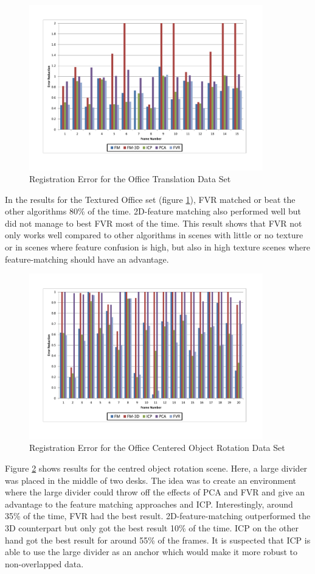 \begin{figure}[!htb]
\centering
\includegraphics[width=4.0in]{images/results/Office_TexturedItems_Translation}
\caption{Registration Error for the Office Translation Data Set}
\label{fig:PET8}
\end{figure}

In the results for the Textured Office set (figure \ref{fig:PET8}), FVR matched or beat the other algorithms 80\% of the time. 2D-feature matching also performed well but did not manage to best FVR most of the time. This result shows that FVR not only works well compared to other algorithms in scenes with little or no texture or in scenes where feature confusion is high, but also in high texture scenes where feature-matching should have an advantage. \\


\begin{figure}[!htb]
\centering
\includegraphics[width=4.0in]{images/results/Office_Texture_blind_spot_rotation}
\caption{Registration Error for the Office Centered Object Rotation Data Set}
\label{fig:PET9}
\end{figure}

Figure \ref{fig:PET9} shows results for the centred object rotation scene. Here, a large divider was placed in the middle of two desks. The idea was to create an environment where the large divider could throw off the effects of PCA and FVR and give an advantage to the feature matching approaches and ICP. Interestingly, around 35\% of the time, FVR had the best result. 2D-feature-matching outperformed the 3D counterpart but only got the best result 10\% of the time. ICP on the other hand got the best result for around 55\% of the frames. It is suspected that ICP is able to use the large divider as an anchor which would make it more robust to non-overlapped data.

